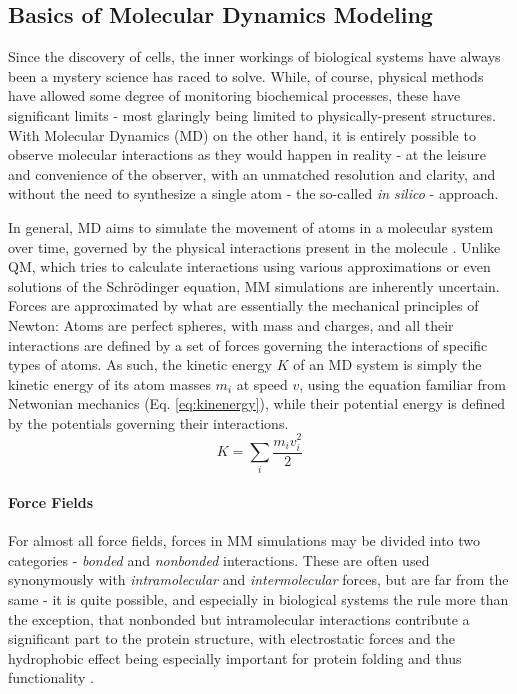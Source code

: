 \documentclass[oneside]{scrreprt}
\begin{document}
\subsection{Basics of Molecular Dynamics Modeling}

Since the discovery of cells, the inner workings of biological systems have always been a mystery science has raced to solve. While, of course, physical methods have allowed some degree of monitoring biochemical processes, these have significant limits - most glaringly being limited to physically-present structures. With Molecular Dynamics (MD) on the other hand, it is entirely possible to observe molecular interactions as they would happen in reality - at the leisure and convenience of the observer, with an unmatched resolution and clarity, and without the need to synthesize a single atom - the so-called \emph{in silico} - approach.

In general, MD aims to simulate the movement of atoms in a molecular system over time, governed by the physical interactions present in the molecule \cite{Hollingsworth2018Sep}. Unlike QM, which tries to calculate interactions using various approximations or even solutions of the Schrödinger equation, MM simulations are inherently uncertain. Forces are approximated by what are essentially the mechanical principles of Newton: Atoms are perfect spheres, with mass and charges, and all their interactions are defined by a set of forces governing the interactions of specific types of atoms. As such, the kinetic energy $K$ of an MD system is simply the kinetic energy of its atom masses $m_i$  at speed $v$, using the equation familiar from Netwonian mechanics (Eq. \ref{eq:kinenergy}), while their potential energy is defined by the potentials governing their interactions.
\begin{equation}\label{eq:kinenergy}
    K=\sum_i\frac{m_i v_i^2}{2}
\end{equation}

\paragraph{Force Fields}
For almost all force fields, forces in MM simulations may be divided into two categories - \emph{bonded} and \emph{nonbonded} interactions. These are often used synonymously with \emph{intramolecular} and \emph{intermolecular} forces, but are far from the same - it is quite possible, and especially in biological systems the rule more than the exception, that nonbonded but intramolecular interactions contribute a significant part to the protein structure, with electrostatic forces and the hydrophobic effect being especially important for protein folding and thus functionality \cite{kumar_close-range_2002}.
\end{document}
